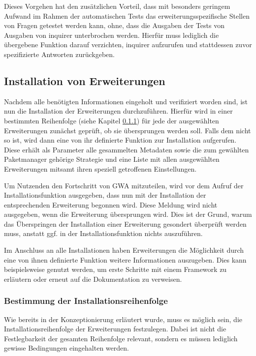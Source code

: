Dieses Vorgehen hat den zusätzlichen Vorteil, dass mit besonders geringem Aufwand im Rahmen der automatischen Tests das erweiterungsspezifische Stellen von Fragen getestet werden kann, ohne, dass die Ausgaben der Tests von Ausgaben von inquirer unterbrochen werden. Hierfür muss lediglich die übergebene Funktion darauf verzichten, inquirer aufzurufen und stattdessen zuvor spezifizierte Antworten zurückgeben.

\subsection{Installation von Erweiterungen}
Nachdem alle benötigten Informationen eingeholt und verifiziert worden sind, ist nun die Installation der Erweiterungen durchzuführen. Hierfür wird in einer bestimmten Reihenfolge (siehe Kapitel \ref{impl:determine_installation_order}) für jede der ausgewählten Erweiterungen zunächst geprüft, ob sie übersprungen werden soll. Falls dem nicht so ist, wird dann eine von ihr definierte Funktion zur Installation aufgerufen. Diese erhält als Parameter alle gesammelten Metadaten sowie die zum gewählten Paketmanager gehörige Strategie und eine Liste mit allen ausgewählten Erweiterungen mitsamt ihren speziell getroffenen Einstellungen.

Um Nutzenden den Fortschritt von \gls{GWA} mitzuteilen, wird vor dem Aufruf der Installationsfunktion ausgegeben, dass nun mit der Installation der entsprechenden Erweiterung begonnen wird. Diese Meldung wird nicht ausgegeben, wenn die Erweiterung übersprungen wird. Dies ist der Grund, warum das Überspringen der Installation einer Erweiterung gesondert überprüft werden muss, anstatt ggf. in der Installationsfunktion nichts auszuführen.

Im Anschluss an alle Installationen haben Erweiterungen die Möglichkeit durch eine von ihnen definierte Funktion weitere Informationen auszugeben. Dies kann beispielsweise genutzt werden, um erste Schritte mit einem Framework zu erläutern oder erneut auf die Dokumentation zu verweisen.

\subsubsection{Bestimmung der Installationsreihenfolge}
\label{impl:determine_installation_order}
Wie bereits in der Konzeptionierung erläutert wurde, muss es möglich sein, die Installationsreihenfolge der Erweiterungen festzulegen. Dabei ist nicht die Festlegbarkeit der gesamten Reihenfolge relevant, sondern es müssen lediglich gewisse Bedingungen eingehalten werden.

